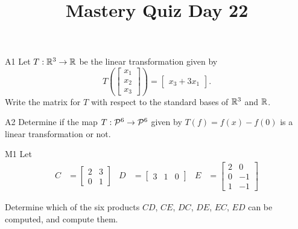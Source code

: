 \documentclass{sbgLAquiz}
\title{Mastery Quiz Day 22 }
\begin{document}
\begin{problem}{A1}
Let $T: \IR^3 \rightarrow \IR$ be the linear transformation given by $$T\left(\begin{bmatrix} x_1 \\ x_2 \\ x_3  \end{bmatrix} \right) = \begin{bmatrix} x_3+3x_1 \end{bmatrix}.$$ Write the matrix for $T$ with respect to the standard bases of $\IR^3$ and $\IR$.
\end{problem}

\begin{problem}{A2}
Determine if the map $T: \P^6  \rightarrow \P^6$ given by $T(f) = f(x)-f(0)$ is a linear transformation or not.
\end{problem}
\newpage

\begin{problem}{M1}
Let
\begin{align*}
C &= \begin{bmatrix} 2 & 3 \\ 0 & 1 \end{bmatrix} & D&= \begin{bmatrix} 3 & 1 & 0 \end{bmatrix} & E&= \begin{bmatrix} 2 & 0 \\ 0 & -1 \\ 1 & -1 \end{bmatrix}
\end{align*}

Determine which of the six products $CD$, $CE$, $DC$, $DE$, $EC$, $ED$ can be computed, and compute them.
\end{problem}
\end{document}
